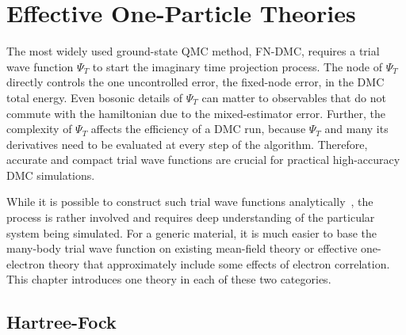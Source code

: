 \section{Effective One-Particle Theories}
The most widely used ground-state QMC method, FN-DMC, requires a trial wave function $\Psi_T$ to start the imaginary time projection process.
The node of $\Psi_T$ directly controls the one uncontrolled error, the fixed-node error, in the DMC total energy.
Even bosonic details of $\Psi_T$ can matter to observables that do not commute with the hamiltonian due to the mixed-estimator error.
Further, the complexity of $\Psi_T$ affects the efficiency of a DMC run, because $\Psi_T$ and many its derivatives need to be evaluated at every step of the algorithm.
Therefore, accurate and compact trial wave functions are crucial for practical high-accuracy DMC simulations.

While it is possible to construct such trial wave functions analytically~\cite{Holzmann2003,Holzmann2006,Pierleoni2008}, the process is rather involved and requires deep understanding of the particular system being simulated.
For a generic material, it is much easier to base the many-body trial wave function on existing mean-field theory or effective one-electron theory that approximately include some effects of electron correlation.
This chapter introduces one theory in each of these two categories.

\subsection{Hartree-Fock}

